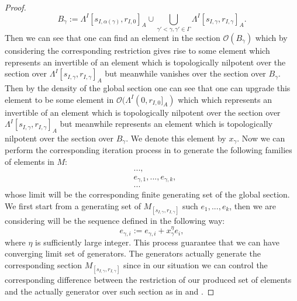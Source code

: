 \documentclass[12pt]{amsart}
\theoremstyle{definition}
\numberwithin{equation}{section}
\begin{document}
\begin{proof}
\begin{displaymath}
B_\gamma:=	\Lambda^I[s_{I,\alpha(\gamma)},r_{I,0}]_A\cup \bigcup_{\gamma'<\gamma,\gamma'\in \Gamma}\Lambda^I[s_{I,\gamma},r_{I,\gamma}]_A.
\end{displaymath}
Then we can see that one can find an element in the section $\mathcal{O}(B_\gamma)$ which by considering the corresponding restriction gives rise to some element which represents an invertible of an element which is topologically nilpotent over the section over $\Lambda^I[s_{I,\gamma},r_{I,\gamma}]_A$ but meanwhile vanishes over the section over $B_\gamma$. Then by the density of the global section one can see that one can upgrade this element to be some element in $\mathcal{O}(\Lambda^I(0,r_{I,0}]_A)$ which which represents an invertible of an element which is topologically nilpotent over the section over $\Lambda^I[s_{I,\gamma},r_{I,\gamma}]_A$ but meanwhile represents an element which is topologically nilpotent over the section over $B_\gamma$. We denote this element by $x_\gamma$. Now we can perform the corresponding iteration process in \cite[proposition 2.6.17]{KL2} to generate the following families of elements in $M$:
\begin{align}
&...,\\
&e_{\gamma,1},...,e_{\gamma,k},\\
&...	
\end{align}
whose limit will be the corresponding finite generating set of the global section. We first start from a generating set of $M_{[s_{I,\gamma},r_{I,\gamma}]}$ such $e_1,...,e_k$, then we are considering will be the sequence defined in the following way:
\begin{displaymath}
e_{\gamma,i}:=e_{\gamma,i}+x_\gamma^\eta e_i,  	
\end{displaymath}
where $\eta$ is sufficiently large integer. This process guarantee that we can have converging limit set of generators. The generators actually generate the corresponding section $M_{[s_{I,\gamma},r_{I,\gamma}]}$ since in our situation we can control the corresponding difference between the restriction of our produced set of elements and the actually generator over such section as in \cite[proposition 2.6.17]{KL2} and \cite[Lemma 2.1.12]{KPX}.








\end{proof}
\end{document}
